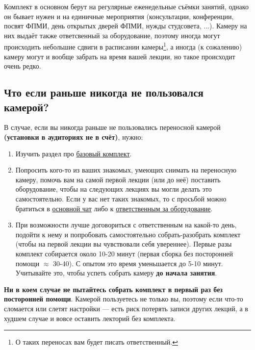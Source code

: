 Комплект в основном берут на регулярные еженедельные съёмки занятий, однако он бывает нужен и на единичные мероприятия (консультации, конференции, посвят ФПМИ, день открытых дверей ФПМИ, нужды студсовета, ...). Камеру на них выдаёт также ответсвенный за оборудование, поэтому иногда могут происходить небольшие сдвиги в расписании камеры\footnote{О таких переносах вам будет писать ответственный.}, а иногда (к сожалению) камеру могут и вообще забрать на время вашей лекции, но такое происходит очень редко.

\subsection{Что если раньше никогда не пользовался камерой?}

В случае, если вы никогда раньше не пользовались переносной камерой \textbf{(установки в аудиториях не в счёт)}, нужно:
\begin{enumerate}
  \item Изучить раздел про \hyperref[ssec:basic-set]{базовый комплект}.

  \item Попросить кого-то из ваших знакомых, умеющих снимать на переносную камеру, помочь вам на самой первой лекции (или до неё) поставить оборудование, чтобы на следующих лекциях вы могли делать это самостоятельно. Если у вас нет таких знакомых, то с просьбой можно братиться в \hyperlink{main-chat-vk}{основной чат} либо к \hyperlink{responsible-for-equipment}{ответственным за оборудование}.

  \item При возможности лучше договориться с ответственным на какой-то день, подойти к нему и попробовать самостоятельно собрать-разобрать комплект (чтобы на первой лекции вы чувствовали себя увереннее). Первые разы комплект собирается около 10-20 минут (первая сборка без посторонней помощи $\approx$ 30-40). С опытом это время уменьшается до 5-10 минут. Учитывайте это, чтобы успеть собрать камеру \textbf{до начала занятия}.
\end{enumerate}

\textbf{Ни в коем случае не пытайтесь собрать комплект в первый раз без посторонней помощи}. Камерой пользуетесь не только вы, поэтому если что-то сломается или слетят настройки --- есть риск потерять записи других лекций, а в худшем случае и вовсе оставить лекторий без комплекта.



